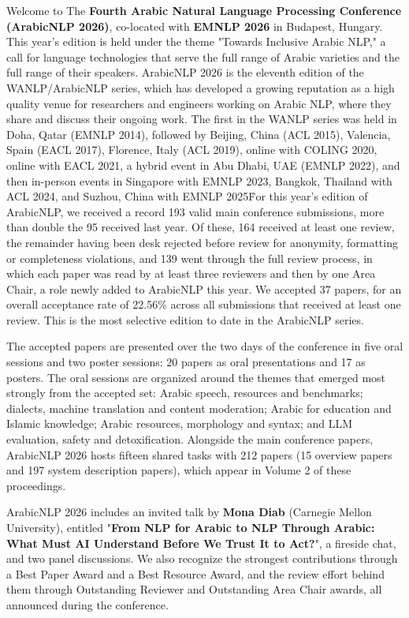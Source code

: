 Welcome to The \textbf{Fourth Arabic Natural Language Processing Conference (ArabicNLP 2026)}, co-located with \textbf{EMNLP 2026} in Budapest, Hungary. This year's edition is held under the theme "Towards Inclusive Arabic NLP," a call for language technologies that serve the full range of Arabic varieties and the full range of their speakers. ArabicNLP 2026 is the eleventh edition of the WANLP/ArabicNLP series, which has developed a growing reputation as a high quality venue for researchers and engineers working on Arabic NLP, where they share and discuss their ongoing work. The first in the WANLP series was held in Doha, Qatar (EMNLP 2014), followed by Beijing, China (ACL 2015), Valencia, Spain (EACL 2017), Florence, Italy (ACL 2019), online with COLING 2020, online with EACL 2021, a hybrid event in Abu Dhabi, UAE (EMNLP 2022), and then in-person events in Singapore with EMNLP 2023, Bangkok, Thailand with ACL 2024, and Suzhou, China with EMNLP 2025\. For this year's edition of ArabicNLP, we received a record 193 valid main conference submissions, more than double the 95 received last year. Of these, 164 received at least one review, the remainder having been desk rejected before review for anonymity, formatting or completeness violations, and 139 went through the full review process, in which each paper was read by at least three reviewers and then by one Area Chair, a role newly added to ArabicNLP this year. We accepted 37 papers, for an overall acceptance rate of 22.56\% across all submissions that received at least one review. This is the most selective edition to date in the ArabicNLP series.

The accepted papers are presented over the two days of the conference in five oral sessions and two poster sessions: 20 papers as oral presentations and 17 as posters. The oral sessions are organized around the themes that emerged most strongly from the accepted set: Arabic speech, resources and benchmarks; dialects, machine translation and content moderation; Arabic for education and Islamic knowledge; Arabic resources, morphology and syntax; and LLM evaluation, safety and detoxification. Alongside the main conference papers, ArabicNLP 2026 hosts fifteen shared tasks with 212 papers (15 overview papers and 197 system description papers), which appear in Volume 2 of these proceedings.

ArabicNLP 2026 includes an invited talk by \textbf{Mona Diab} (Carnegie Mellon University), entitled "\textbf{From NLP for Arabic to NLP Through Arabic: What Must AI Understand Before We Trust It to Act?}", a fireside chat, and two panel discussions. We also recognize the strongest contributions through a Best Paper Award and a Best Resource Award, and the review effort behind them through Outstanding Reviewer and Outstanding Area Chair awards, all announced during the conference.

